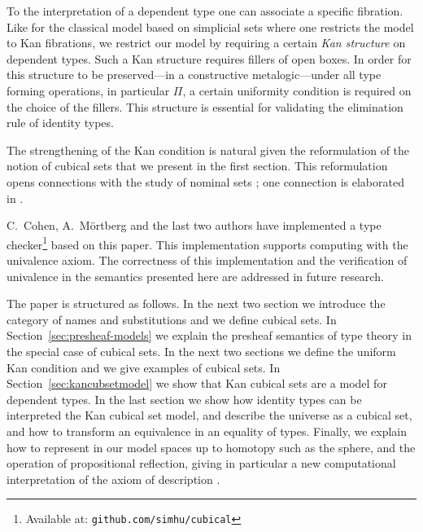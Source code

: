 \documentclass[10pt,a4paper]{article}
\begin{document}
To the interpretation of a dependent type one can associate a specific
fibration.  Like for the classical model based on simplicial sets
where one restricts the model to Kan fibrations, we restrict our model
by requiring a certain \emph{Kan structure} on dependent types.  Such
a Kan structure requires fillers of open boxes.  In order for this
structure to be preserved---in a constructive metalogic---under all
type forming operations, in particular $\Pi$, a certain uniformity
condition is required on the choice of the fillers. This structure is
essential for validating the elimination rule of identity types.

The strengthening of the Kan condition is natural given the
reformulation of the notion of cubical sets that we present in the
first section. This reformulation opens connections with the study of
nominal sets \cite{pitts}; one connection is elaborated in
\cite{Pitts}.



C.~Cohen, A.~M\"ortberg and the last two authors have implemented a
type checker\footnote{Available at: {\tt github.com/simhu/cubical}}
based on this paper.  This implementation supports computing with the
univalence axiom.  The correctness of this implementation and the
verification of univalence in the semantics presented here are
addressed in future research.

The paper is structured as follows. In the next two section we
introduce the category of names and substitutions and we define
cubical sets.  In Section~\ref{sec:presheaf-models} we explain the
presheaf semantics of type theory in the special case of cubical
sets. In the next two sections we define the uniform Kan condition and
we give examples of cubical sets.  In Section~\ref{sec:kancubsetmodel}
we show that Kan cubical sets are a model for dependent types.  In the
last section we show how identity types can be interpreted the Kan
cubical set model, and describe the universe as a cubical set, and how
to transform an equivalence in an equality of types.  Finally, we
explain how to represent in our model spaces up to homotopy such as
the sphere, and the operation of propositional reflection, giving in
particular a new computational interpretation of the axiom of
description \cite{Russell}.
\end{document}
